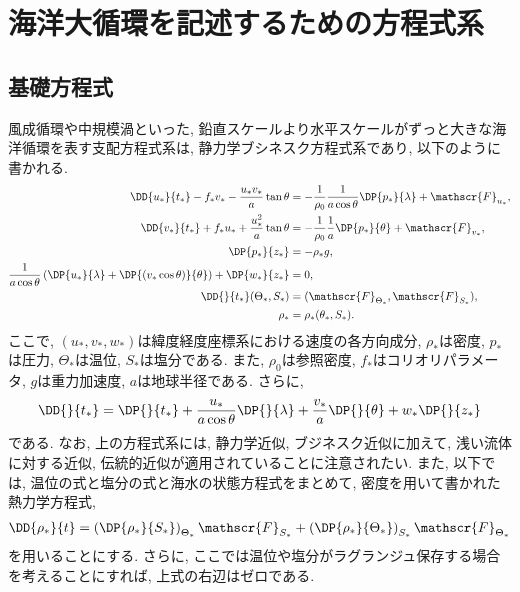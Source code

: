 \chapter{海洋大循環を記述するための方程式系}
\section{基礎方程式}
風成循環や中規模渦といった, 鉛直スケールより水平スケールがずっと大きな海洋循環を表す支配方程式系は, 
静力学ブシネスク方程式系であり, 以下のように書かれる. 
\begin{subequations} %
  \begin{align}
    \DD{u_*}{t_*} - f_* v_* - \dfrac{u_* v_*}{a} \tan \theta  &= - \dfrac{1}{\rho_0} \dfrac{1}{a \cos \theta} \DP{p_*}{\lambda} + \mathscr{F}_{u_*}, \\
    \DD{v_*}{t_*} + f_* u_* + \dfrac{u_*^2}{a} \tan \theta &= - \dfrac{1}{\rho_0} \dfrac{1}{a} \DP{p_*}{\theta} + \mathscr{F}_{v_*}, \\
    \DP{p_*}{z_*} &= - \rho_* g, \\
    \dfrac{1}{a \cos \theta} \left( \DP{u_*}{\lambda} + \DP{ (v_* \cos{\theta})}{\theta} \right)  + \DP{w_*}{z_*} &= 0, \\
    \DD{}{t_*} (\Theta_*, S_*) &= (\mathscr{F}_{\Theta_*}, \mathscr{F}_{S_*}), \\
    \rho_* &= \rho_* (\theta_*, S_*). 
  \end{align}
  \label{eq:basic_system}
\end{subequations}
ここで, $(u_*,v_*,w_*)$は緯度経度座標系における速度の各方向成分, 
$\rho_*$は密度, $p_*$は圧力, $\Theta_*$は温位, $S_*$は塩分である. 
また, $\rho_0$は参照密度, $f_*$はコリオリパラメータ, $g$は重力加速度, 
$a$は地球半径である. 
さらに, 
\begin{equation}
  \DD{}{t_*} =  \DP{}{t_*} + \dfrac{u_*}{a \cos \theta}\DP{}{\lambda} + \dfrac{v_*}{a} \DP{}{\theta} + w_* \DP{}{z_*}
\end{equation}
である. 
なお, 上の方程式系には, 静力学近似, ブジネスク近似に加えて, 
浅い流体に対する近似, 伝統的近似が適用されていることに注意されたい. 
また, 以下では, 温位の式と塩分の式と海水の状態方程式をまとめて, 密度を用いて書かれた熱力学方程式, 
\begin{align}
 \DD{\rho_*}{t} = \left(\DP{\rho_*}{S_*}\right)_{\Theta_*} \mathscr{F}_{S_*} + \left(\DP{\rho_*}{\Theta_*}\right)_{S_*} \mathscr{F}_{\Theta_*} 
\end{align}
を用いることにする. 
さらに, ここでは温位や塩分がラグランジュ保存する場合を考えることにすれば, 
上式の右辺はゼロである. 

